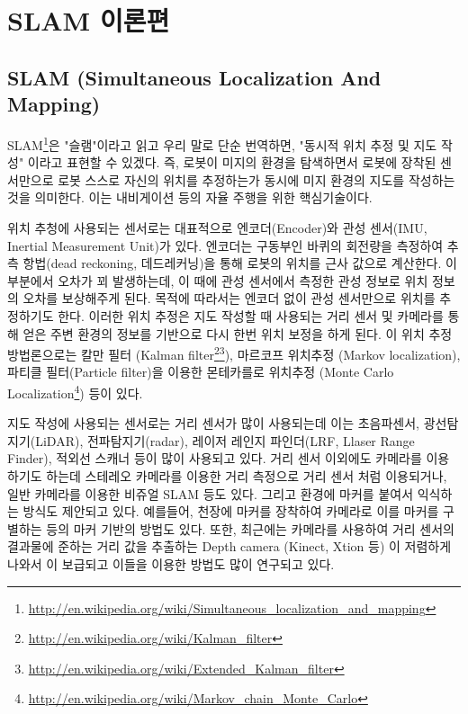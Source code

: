 \section{SLAM 이론편}
\label{sec:SlamTheory}

\subsection{SLAM (Simultaneous Localization And Mapping)}

SLAM\footnote{\url{http://en.wikipedia.org/wiki/Simultaneous_localization_and_mapping}}은 "슬램"이라고 읽고 우리 말로 단순 번역하면, "동시적 위치 추정 및 지도 작성" 이라고 표현할 수 있겠다. 즉, 로봇이 미지의 환경을 탐색하면서 로봇에 장착된 센서만으로 로봇 스스로 자신의 위치를 추정하는가 동시에 미지 환경의 지도를 작성하는 것을 의미한다. 이는 내비게이션 등의 자율 주행을 위한 핵심기술이다.

위치 추청에 사용되는 센서로는 대표적으로 엔코더(Encoder)와 관성 센서(IMU, Inertial Measurement Unit)가 있다. 엔코더는 구동부인 바퀴의 회전량을 측정하여 추측 항법(dead reckoning, 데드레커닝)을 통해 로봇의 위치를 근사 값으로 계산한다. 이 부분에서 오차가 꾀 발생하는데, 이 때에 관성 센서에서 측정한 관성 정보로 위치 정보의 오차를 보상해주게 된다. 목적에 따라서는 엔코더 없이 관성 센서만으로 위치를 추정하기도 한다. 이러한 위치 추정은 지도 작성할 때 사용되는 거리 센서 및 카메라를 통해 얻은 주변 환경의 정보를 기반으로 다시 한번 위치 보정을 하게 된다. 이 위치 추정 방법론으로는 칼만 필터 (Kalman filter\footnote{\url{http://en.wikipedia.org/wiki/Kalman_filter}}\footnote{\url{http://en.wikipedia.org/wiki/Extended_Kalman_filter}}), 마르코프 위치추정 (Markov localization), 파티클 필터(Particle filter)을 이용한 몬테카를로 위치추정 (Monte Carlo Localization\footnote{\url{http://en.wikipedia.org/wiki/Markov_chain_Monte_Carlo}}) 등이 있다.

지도 작성에 사용되는 센서로는 거리 센서가 많이 사용되는데 이는 초음파센서, 광선탐지기(LiDAR), 전파탐지기(radar), 레이저 레인지 파인더(LRF, Llaser Range Finder), 적외선 스캐너 등이 많이 사용되고 있다. 거리 센서 이외에도 카메라를 이용하기도 하는데 스테레오 카메라를 이용한 거리 측정으로 거리 센서 처럼 이용되거나, 일반 카메라를 이용한 비쥬얼 SLAM 등도 있다. 그리고 환경에 마커를 붙여서 익식하는 방식도 제안되고 있다. 예를들어, 천장에 마커를 장착하여 카메라로 이를 마커를 구별하는 등의 마커 기반의 방법도 있다. 또한, 최근에는 카메라를 사용하여 거리 센서의 결과물에 준하는 거리 값을 추출하는 Depth camera (Kinect, Xtion 등) 이 저렴하게 나와서 이 보급되고 이들을 이용한 방법도 많이 연구되고 있다.


